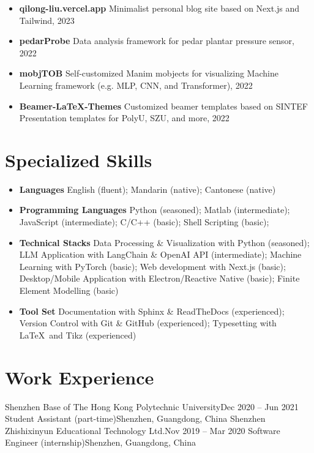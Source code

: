 \documentclass[letterpaper,11pt]{article}
\begin{document}
    \begin{itemize}[leftmargin=0.15in, label={}, itemsep=0em]
        \item \textbf{qilong-liu.vercel.app}
        Minimalist personal blog site based on Next.js and Tailwind, 2023
        \item \textbf{pedarProbe}
        Data analysis framework for pedar plantar pressure sensor, 2022
        \item \textbf{mobjTOB}
        Self-customized Manim mobjects for visualizing Machine Learning framework (e.g. MLP, CNN, and Transformer), 2022
        \item \textbf{Beamer-LaTeX-Themes}
        Customized beamer templates based on SINTEF Presentation templates for PolyU, SZU, and more, 2022
    \end{itemize}

    \section{Specialized Skills}

    \begin{itemize}[leftmargin=0.15in, label={}, itemsep=0em]
        \item \textbf{Languages}
        English (fluent); Mandarin (native); Cantonese (native)
        \item \textbf{Programming Languages}
        Python (seasoned); Matlab (intermediate); JavaScript (intermediate); C/C++ (basic); Shell Scripting (basic);
        \item \textbf{Technical Stacks}
        Data Processing \& Visualization with Python (seasoned); LLM Application with LangChain \& OpenAI API (intermediate); Machine Learning with PyTorch (basic); Web development with Next.js (basic); Desktop/Mobile Application with Electron/Reactive Native (basic); Finite Element Modelling (basic)
        \item \textbf{Tool Set}
        Documentation with Sphinx \& ReadTheDocs (experienced); Version Control with Git \& GitHub (experienced); Typesetting with \LaTeX\ and Tikz (experienced)
    \end{itemize}

    \section{Work Experience}

    \resumeSubHeadingListStart
        \resumeSubheading
            {Shenzhen Base of The Hong Kong Polytechnic University}{Dec 2020 -- Jun 2021}
            {Student Assistant (part-time)}{Shenzhen, Guangdong, China}
        \resumeSubheading
            {Shenzhen Zhishixinyun Educational Technology Ltd.}{Nov 2019 -- Mar 2020}
            {Software Engineer (internship)}{Shenzhen, Guangdong, China}
    \resumeSubHeadingListEnd
\end{document}
